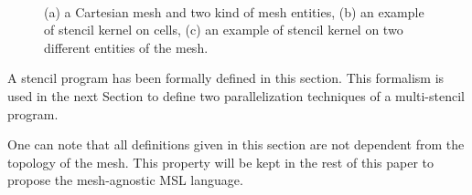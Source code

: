 \begin{figure}
\begin{center}
\\
\hspace{10pt}
\vspace{20pt}
\end{center}
\caption{(a) a Cartesian mesh and two kind of mesh entities, (b) an example of stencil kernel on cells, (c) an example of stencil kernel on two different entities of the mesh.}
\label{fig:gspmsp}
\end{figure}

A stencil program has been formally defined in this section. This formalism is used in the next Section to define two parallelization techniques of a multi-stencil program.

One can note that all definitions given in this section are not dependent from the topology of the mesh. This property will be kept in the rest of this paper to propose the mesh-agnostic MSL language.


